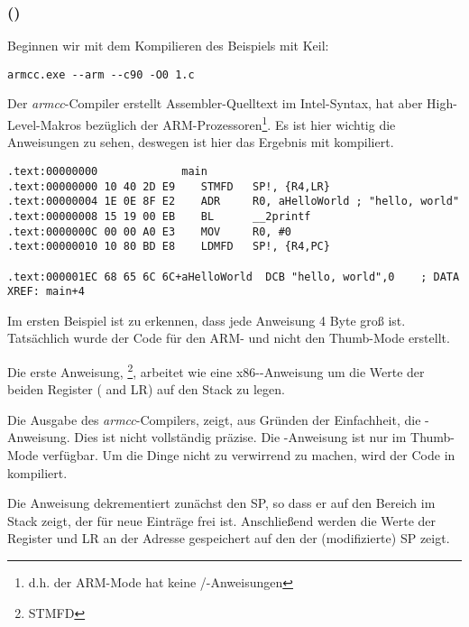 \subsubsection{\NonOptimizingKeilVI (\ARMMode)}

Beginnen wir mit dem Kompilieren des Beispiels mit Keil:

\begin{lstlisting}
armcc.exe --arm --c90 -O0 1.c 
\end{lstlisting}

\myindex{\IntelSyntax}
Der \emph{armcc}-Compiler erstellt Assembler-Quelltext im Intel-Syntax, hat aber High-Level-Makros
bezüglich der ARM-Prozessoren\footnote{d.h. der ARM-Mode hat keine \PUSH/\POP-Anweisungen}.
Es ist hier wichtig die  Anweisungen zu sehen, deswegen ist hier das Ergebnis mit
\IDA kompiliert.

\begin{lstlisting}[caption=\NonOptimizingKeilVI (\ARMMode) \IDA,style=customasmARM]
.text:00000000             main
.text:00000000 10 40 2D E9    STMFD   SP!, {R4,LR}
.text:00000004 1E 0E 8F E2    ADR     R0, aHelloWorld ; "hello, world"
.text:00000008 15 19 00 EB    BL      __2printf
.text:0000000C 00 00 A0 E3    MOV     R0, #0
.text:00000010 10 80 BD E8    LDMFD   SP!, {R4,PC}

.text:000001EC 68 65 6C 6C+aHelloWorld  DCB "hello, world",0    ; DATA XREF: main+4
\end{lstlisting}

Im ersten Beispiel ist zu erkennen, dass jede Anweisung 4 Byte groß ist.
Tatsächlich wurde der Code für den ARM- und nicht den Thumb-Mode erstellt.

Die erste Anweisung, \footnote{\ac{STMFD}}, arbeitet wie eine x86-\PUSH-Anweisung
um die Werte der beiden Register ( and \ac{LR}) auf den Stack zu legen.

Die Ausgabe des \emph{armcc}-Compilers, zeigt, aus Gründen der Einfachheit, die -Anweisung.
Dies ist nicht vollständig präzise. Die \PUSH-Anweisung ist nur im Thumb-Mode verfügbar.
Um die Dinge nicht zu verwirrend zu machen, wird der Code in \IDA kompiliert.

Die Anweisung dekrementiert zunächst den \ac{SP}, so dass er auf den Bereich im Stack zeigt, der
für neue Einträge frei ist. Anschließend werden die Werte der Register  und \ac{LR} an der Adresse
gespeichert auf den der (modifizierte) \ac{SP} zeigt.

